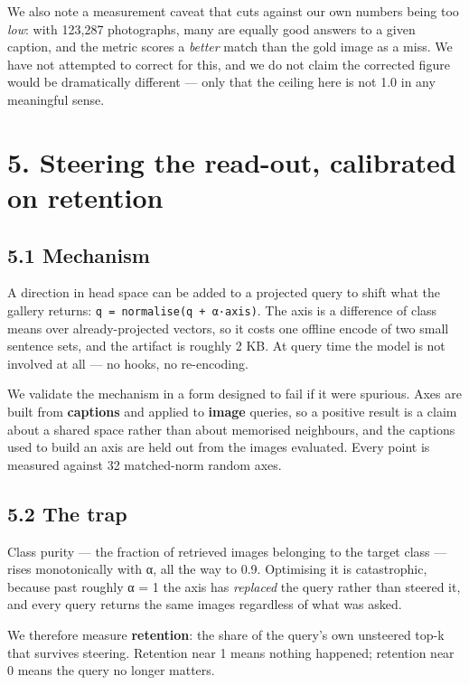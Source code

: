\documentclass[
  11pt,
]{article}
\begin{document}
We also note a measurement caveat that cuts against our own numbers
being too \emph{low}: with 123,287 photographs, many are equally good
answers to a given caption, and the metric scores a \emph{better} match
than the gold image as a miss. We have not attempted to correct for
this, and we do not claim the corrected figure would be dramatically
different --- only that the ceiling here is not 1.0 in any meaningful
sense.

\section{5. Steering the read-out, calibrated on
retention}\label{steering-the-read-out-calibrated-on-retention}

\subsection{5.1 Mechanism}\label{mechanism}

A direction in head space can be added to a projected query to shift
what the gallery returns:
\texttt{q\textquotesingle{}\ =\ normalise(q\ +\ α·axis)}. The axis is a
difference of class means over already-projected vectors, so it costs
one offline encode of two small sentence sets, and the artifact is
roughly 2 KB. At query time the model is not involved at all --- no
hooks, no re-encoding.

We validate the mechanism in a form designed to fail if it were
spurious. Axes are built from \textbf{captions} and applied to
\textbf{image} queries, so a positive result is a claim about a shared
space rather than about memorised neighbours, and the captions used to
build an axis are held out from the images evaluated. Every point is
measured against 32 matched-norm random axes.

\subsection{5.2 The trap}\label{the-trap}

Class purity --- the fraction of retrieved images belonging to the
target class --- rises monotonically with α, all the way to 0.9.
Optimising it is catastrophic, because past roughly α = 1 the axis has
\emph{replaced} the query rather than steered it, and every query
returns the same images regardless of what was asked.

We therefore measure \textbf{retention}: the share of the query's own
unsteered top-k that survives steering. Retention near 1 means nothing
happened; retention near 0 means the query no longer matters.
\end{document}
